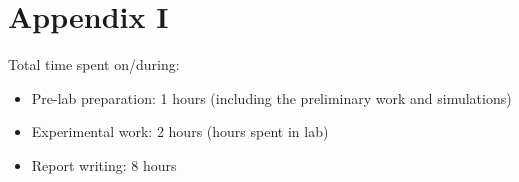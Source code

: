 \documentclass[letterpaper,12pt]{article}
\begin{document}
\section*{Appendix I}
Total time spent on/during:
\begin{itemize}
	\item Pre-lab preparation: 1 hours (including the preliminary work and simulations) 
	\item Experimental work: 2 hours (hours spent in lab)
	\item Report writing: 8 hours 
\end{itemize}



\end{document}
